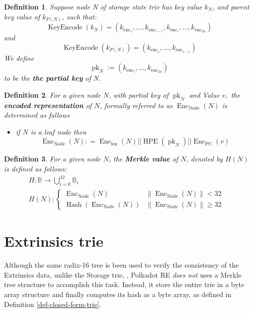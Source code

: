 \documentclass{article}
\newcommand{\assign}{:=}
\newcommand{\tmem}[1]{{\em #1\/}}
\newcommand{\tmop}[1]{\ensuremath{\operatorname{#1}}}
\newcommand{\tmstrong}[1]{\textbf{#1}}
\newtheorem{definition}{Definition}
\begin{document}
\begin{definition}
  Suppose node N of storage state trie has key value $k_N$, and parent key
  value of $k_{P (N)}$, such that:
  \[ \tmop{KeyEncode} (k_N) = (k_{\tmop{enc}_1}, \ldots, k_{\tmop{enc}_{i -
     1}}, k_{\tmop{enc}_i}, \ldots, k_{\tmop{enc}_{2 n}}) \]
  and
  \[ \tmop{KeyEncode} (k_{P (N)}) = (k_{\tmop{enc}_1}, \ldots,
     k_{\tmop{enc}_{i - 1}}) \]
  We define
  \[ \tmop{pk}_N \assign (k_{\tmop{enc}_i}, \ldots, k_{\tmop{enc}_{2 n}}) \]
  to be the {\tmstrong{the partial key}} of N.
\end{definition}

\begin{definition}
  For a given node $N$, with partial key of $\tmop{pk}_N$ and Value $v,$ the
  {\tmstrong{encoded representation}} of $N$, formally referred to as
  $\tmop{Enc}_{\tmop{Node}} (N)$ is determined as fallows
  \begin{itemize}
    \item if $N$ is a leaf node then
    \[ \tmop{Enc}_{\tmop{Node}} (N) : = \tmop{Enc}_{\tmop{len}} (N) | |
       \tmop{HPE} (\tmop{pk}_N) | | \tmop{Enc}_{\tmop{PC}} (v) \]
  \end{itemize}
\end{definition}

\begin{definition}
  For a given node $N$, the {\tmstrong{Merkle value}} of $N$, denoted by $H
  (N)$ is defined as follows:
  \[ \begin{array}{lll}
       & H : \mathbb{B} \rightarrow \bigcup_{i = 0^{}}^{32} \mathbb{B}_i & \\
       & H (N) : \left\{ \begin{array}{lll}
         \tmop{Enc}_{\tmop{Node}} (N) & \| \tmop{Enc}_{\tmop{Node}} (N) \| <
         32 & \\
         \tmop{Hash} (\tmop{Enc}_{\tmop{Node}} (N)) & \|
         \tmop{Enc}_{\tmop{Node}} (N) \| \geqslant 32 & 
       \end{array} \right. & 
     \end{array} \]
  
\end{definition}

\section{Extrinsics trie}

Although the same radix-16 tree is been used to verify the consistency of the
Extrinsics data, unlike the Storage trie, , Polkadot RE {\tmem{does not}} uses
a Merkle tree structure to accomplish this task. Instead, it store the entire
trie in a byte array structure and finally computes its hash as a byte array,
as defined in Definition \ref{def-closed-form-trie}.
\end{document}
